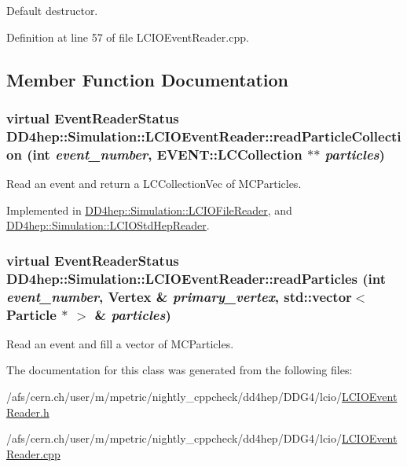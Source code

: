 Default destructor. 

Definition at line 57 of file LCIOEventReader.cpp.

\subsection{Member Function Documentation}
\hypertarget{class_d_d4hep_1_1_simulation_1_1_l_c_i_o_event_reader_a49acaafd98bbd6a954b29cfd9465d017}{
\subsubsection[{readParticleCollection}]{\setlength{\rightskip}{0pt plus 5cm}virtual {\bf EventReaderStatus} DD4hep::Simulation::LCIOEventReader::readParticleCollection (int {\em event\_\-number}, \/  EVENT::LCCollection $\ast$$\ast$ {\em particles})}}
\label{class_d_d4hep_1_1_simulation_1_1_l_c_i_o_event_reader_a49acaafd98bbd6a954b29cfd9465d017}


Read an event and return a LCCollectionVec of MCParticles. 

Implemented in \hyperlink{class_d_d4hep_1_1_simulation_1_1_l_c_i_o_file_reader_a4163f75ac06423136ab2c3e806713b83}{DD4hep::Simulation::LCIOFileReader}, and \hyperlink{class_d_d4hep_1_1_simulation_1_1_l_c_i_o_std_hep_reader_ab358476ce7a1bab27504d2bfe4b8b630}{DD4hep::Simulation::LCIOStdHepReader}.\hypertarget{class_d_d4hep_1_1_simulation_1_1_l_c_i_o_event_reader_a76241be8cda1ad304f15f3613fca976b}{
\subsubsection[{readParticles}]{\setlength{\rightskip}{0pt plus 5cm}virtual {\bf EventReaderStatus} DD4hep::Simulation::LCIOEventReader::readParticles (int {\em event\_\-number}, \/  {\bf Vertex} \& {\em primary\_\-vertex}, \/  std::vector$<$ {\bf Particle} $\ast$ $>$ \& {\em particles})}}
\label{class_d_d4hep_1_1_simulation_1_1_l_c_i_o_event_reader_a76241be8cda1ad304f15f3613fca976b}


Read an event and fill a vector of MCParticles. 

The documentation for this class was generated from the following files:\begin{DoxyCompactItemize}
\item 
/afs/cern.ch/user/m/mpetric/nightly\_\-cppcheck/dd4hep/DDG4/lcio/\hyperlink{_l_c_i_o_event_reader_8h}{LCIOEventReader.h}\item 
/afs/cern.ch/user/m/mpetric/nightly\_\-cppcheck/dd4hep/DDG4/lcio/\hyperlink{_l_c_i_o_event_reader_8cpp}{LCIOEventReader.cpp}\end{DoxyCompactItemize}
